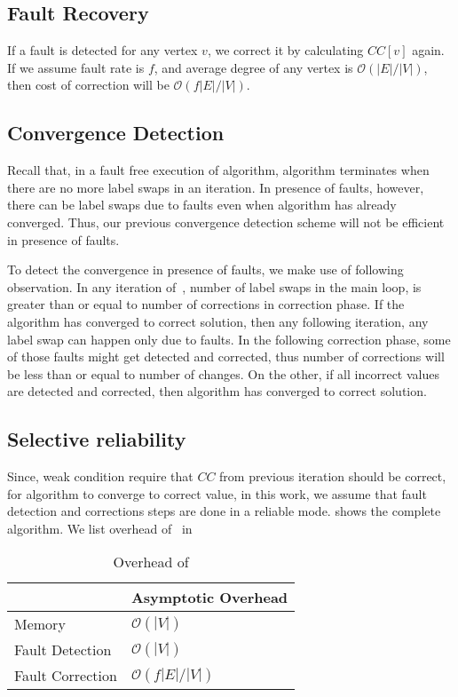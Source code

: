 \subsection{Fault Recovery}
If a fault is detected for any vertex $v$, we correct it by calculating $CC[v]$ again. 
If we assume fault rate is $f$, and average degree of any vertex is $\mathcal{O}(|E|/|V|)$, 
then cost of correction will be $\mathcal{O}(f|E|/|V|)$.

\subsection{Convergence Detection}
Recall that, in a fault free execution of \sv algorithm, algorithm terminates when there
are no more label swaps in an iteration. In presence of faults, however, there can be label
swaps due to faults even when algorithm has already converged. Thus, our previous 
convergence detection scheme will not be efficient in presence of faults. 

%
To detect the convergence in presence of faults, we make use of following observation. 
In any iteration of~, number of label swaps in the main loop, is greater 
than or equal to number of corrections in correction phase.  If the algorithm has converged to 
correct solution, then any following iteration, any label swap can happen only due to faults.
In the following correction phase, some of those faults might get detected and corrected, thus 
number of corrections will be less than or equal to number of changes. On the other, if all
incorrect values are detected and corrected, then algorithm has converged to correct solution.  

\subsection{Selective reliability}
Since, weak condition require that $CC$ from previous iteration should be correct, for algorithm
to converge to correct value, in this work, we assume that fault detection and corrections steps 
are done in a reliable mode.   shows the complete algorithm.
We list overhead of~ in 

\begin{table}[htbp]
\centering
\caption{Overhead of \ftsv}
\label{tab:overhead}
\begin{tabular}{l|l}
\toprule 
                 & Asymptotic Overhead     \\
\midrule                  
Memory           & $\mathcal{O}(|V|)$      \\
Fault Detection  & $\mathcal{O}(|V|)$      \\
Fault Correction & $\mathcal{O}(f|E|/|V|)$ \\
\bottomrule 
\end{tabular}
\end{table}
